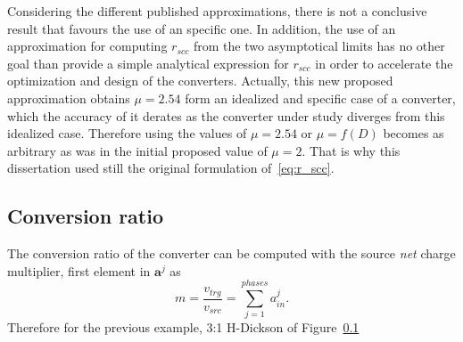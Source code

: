 Considering the different published approximations, there is not a conclusive result that favours the use of an specific one. In addition, the use of an approximation for computing $r_{scc}$ from the two asymptotical limits has no other goal than provide a simple analytical expression for $r_{scc}$ in order to accelerate the optimization and design of the converters. Actually, this new proposed approximation obtains $\mu=2.54$ form an idealized and specific case of a converter, which the accuracy of it derates as the converter under study diverges from this idealized case. Therefore using the values of $\mu = 2.54$ or $\mu = f(D) $ becomes as  arbitrary as was in the initial proposed value of $\mu=2$. That is why this dissertation used still the original formulation of~\eqref{eq:r_scc}.


\afterpage{\clearpage}

\subsection{Conversion ratio}

The conversion ratio of the converter can be computed with the source \emph{net} charge multiplier, first element in $\mathbf{a}^j$ as
\begin{equation}
m=\frac{{v_{trg}}}{v_{src}}=\sum_{j=1}^{phases}a_{in}^j.
\label{eq:r_ssl}
\end{equation}
Therefore for the previous example, 3:1 H-Dickson of Figure~\ref{}


\afterpage{\clearpage}
